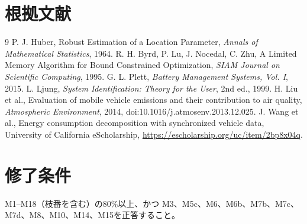 


\section{根拠文献}
\begin{thebibliography}{9}
 P. J. Huber, Robust Estimation of a Location Parameter,
\textit{Annals of Mathematical Statistics}, 1964.
 R. H. Byrd, P. Lu, J. Nocedal, C. Zhu,
A Limited Memory Algorithm for Bound Constrained Optimization,
\textit{SIAM Journal on Scientific Computing}, 1995.
 G. L. Plett, \textit{Battery Management Systems, Vol. I}, 2015.
 L. Ljung, \textit{System Identification: Theory for the User}, 2nd ed., 1999.
 H. Liu et al.,
Evaluation of mobile vehicle emissions and their contribution to air quality,
\textit{Atmospheric Environment}, 2014,
doi:10.1016/j.atmosenv.2013.12.025.
 J. Wang et al.,
Energy consumption decomposition with synchronized vehicle data,
University of California eScholarship, \url{https://escholarship.org/uc/item/2bp8x04q}.
\end{thebibliography}

\section*{修了条件}
M1--M18（枝番を含む）の80\%以上、かつ
M3、M5c、M6、M6b、M7b、M7c、M7d、M8、M10、M14、M15を正答すること。

